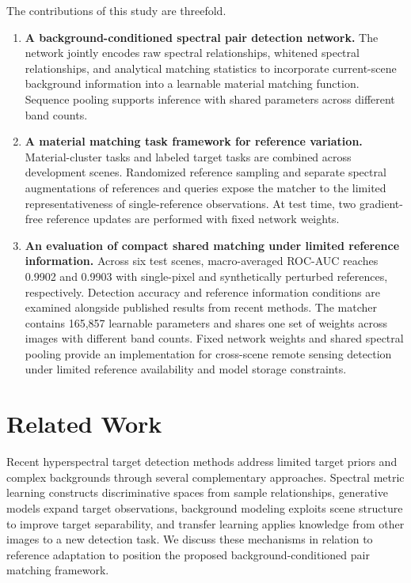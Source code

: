 \documentclass[a4paper,11pt]{article}
\begin{document}
The contributions of this study are threefold.
\begin{enumerate}
\item \textbf{A background-conditioned spectral pair detection network.} The network jointly encodes raw spectral relationships, whitened spectral relationships, and analytical matching statistics to incorporate current-scene background information into a learnable material matching function. Sequence pooling supports inference with shared parameters across different band counts.
\item \textbf{A material matching task framework for reference variation.} Material-cluster tasks and labeled target tasks are combined across development scenes. Randomized reference sampling and separate spectral augmentations of references and queries expose the matcher to the limited representativeness of single-reference observations. At test time, two gradient-free reference updates are performed with fixed network weights.
\item \textbf{An evaluation of compact shared matching under limited reference information.} Across six test scenes, macro-averaged ROC-AUC reaches 0.9902 and 0.9903 with single-pixel and synthetically perturbed references, respectively. Detection accuracy and reference information conditions are examined alongside published results from recent methods. The matcher contains 165,857 learnable parameters and shares one set of weights across images with different band counts. Fixed network weights and shared spectral pooling provide an implementation for cross-scene remote sensing detection under limited reference availability and model storage constraints.
\end{enumerate}

\section{Related Work}
Recent hyperspectral target detection methods address limited target priors and complex backgrounds through several complementary approaches. Spectral metric learning constructs discriminative spaces from sample relationships, generative models expand target observations, background modeling exploits scene structure to improve target separability, and transfer learning applies knowledge from other images to a new detection task. We discuss these mechanisms in relation to reference adaptation to position the proposed background-conditioned pair matching framework.
\end{document}
